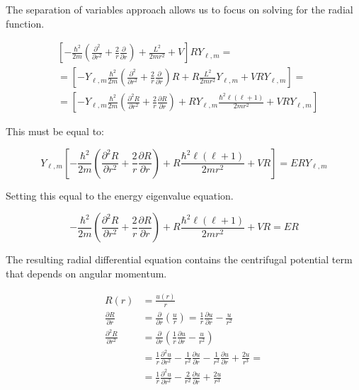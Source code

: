 \documentclass[italian]{HKNdocument}
\begin{document}
The separation of variables approach allows us to focus on solving for the radial function.

\begin{align}
& {\left[-\frac{\hbar^{2}}{2 m}\left(\frac{\partial^{2}}{\partial r^{2}}+\frac{2}{r} \frac{\partial}{\partial r}\right)+\frac{L^{2}}{2 m r^{2}}+V\right] R Y_{\ell, m}=} \\
& =\left[-Y_{\ell, m} \frac{\hbar^{2}}{2 m}\left(\frac{\partial^{2}}{\partial r^{2}}+\frac{2}{r} \frac{\partial}{\partial r}\right) R+R \frac{L^{2}}{2 m r^{2}} Y_{\ell, m}+V R Y_{\ell, m}\right]=  \label{eq:9.31}\\
& =\left[-Y_{\ell, m} \frac{\hbar^{2}}{2 m}\left(\frac{\partial^{2} R}{\partial r^{2}}+\frac{2}{r} \frac{\partial R}{\partial r}\right)+R Y_{\ell, m} \frac{\hbar^{2} \ell(\ell+1)}{2 m r^{2}}+V R Y_{\ell, m}\right]
\end{align}

This must be equal to:

\begin{equation}
Y_{\ell, m}\left[-\frac{\hbar^{2}}{2 m}\left(\frac{\partial^{2} R}{\partial r^{2}}+\frac{2}{r} \frac{\partial R}{\partial r}\right)+R \frac{\hbar^{2} \ell(\ell+1)}{2 m r^{2}}+V R\right]=E R Y_{\ell, m} \label{eq:9.32}
\end{equation}

Setting this equal to the energy eigenvalue equation.

\begin{equation}
-\frac{\hbar^{2}}{2 m}\left(\frac{\partial^{2} R}{\partial r^{2}}+\frac{2}{r} \frac{\partial R}{\partial r}\right)+R \frac{\hbar^{2} \ell(\ell+1)}{2 m r^{2}}+V R=E R \label{eq:9.33}
\end{equation}

The resulting radial differential equation contains the centrifugal potential term that depends on angular momentum.

\begin{align}
R(r) & =\frac{u(r)}{r} \\
\frac{\partial R}{\partial r} & =\frac{\partial}{\partial r}\left(\frac{u}{r}\right)=\frac{1}{r} \frac{\partial u}{\partial r}-\frac{u}{r^{2}} \\
\frac{\partial^{2} R}{\partial r^{2}} & =\frac{\partial}{\partial r}\left(\frac{1}{r} \frac{\partial u}{\partial r}-\frac{u}{r^{2}}\right)  \label{eq:9.34}\\
& =\frac{1}{r} \frac{\partial^{2} u}{\partial r^{2}}-\frac{1}{r^{2}} \frac{\partial u}{\partial r}-\frac{1}{r^{2}} \frac{\partial u}{\partial r}+\frac{2 u}{r^{3}}= \\
& =\frac{1}{r} \frac{\partial^{2} u}{\partial r^{2}}-\frac{2}{r^{2}} \frac{\partial u}{\partial r}+\frac{2 u}{r^{3}}
\end{align}
\end{document}
